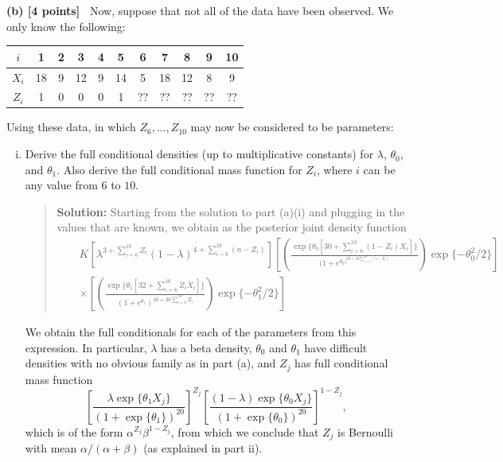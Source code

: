 \documentclass{article}
\newcommand{\svskip}{\vspace{.2in}}
\begin{document}
\svskip
{\bf (b) [4 points]\ }
Now, suppose that not all of the data have been observed.  We
only know the following:

\svskip
\begin{tabular}{c|cccccccccc}
$i$ & 1 & 2 & 3 & 4 & 5 & 6 & 7 & 8 & 9 & 10 \\ \hline
$X_i$ & 18 & 9 & 12 & 9 & 14 & 5 & 18 & 12 & 8 & 9 \\ \hline
$Z_i$ & 1 & 0 & 0 & 0 & 1 & ?? & ?? & ?? & ?? & ?? 
\end{tabular}

\svskip
Using these data, in which $Z_6, \ldots, Z_{10}$ may now be considered
to be parameters:

\begin{enumerate}[(i)]
\item 
Derive the full conditional densities 
(up to multiplicative constants) for $\lambda$, 
$\theta_0$, and $\theta_1$.  Also derive the full conditional 
mass function for $Z_i$, where $i$ can be any value from $6$ 
to $10$.
\begin{quotation}{\bf Solution:}
Starting from the solution to part (a)(i) and plugging in the values that are known, we obtain
as the posterior joint density function
\begin{eqnarray*}
&&
K
\left[ \lambda^{3+\sum_{i=6}^{10} Z_i} (1-\lambda)^{4+\sum_{i=6}^{10}(n-Z_i)}  \right]
\left[ \left( \frac{\exp\{ \theta_0 [30+\sum_{i=6}^{10} (1-Z_i)X_i] \} }
{(1 + e^{\theta_0)^{60+20\sum_{i=6}^{10} (1-Z_i)}}} \right) \exp\{ -\theta_0^2/2\} \right] \\
&&\times 
\left[ \left( \frac{\exp\{  \theta_1 [32 +\sum_{i=6}^{10} Z_i X_i] \}}{(1 + e^{\theta_1})^{40+20\sum_{i=6}^{10} Z_i}} \right) \exp\{ -\theta_1^2/2\} \right]
\end{eqnarray*}
\end{quotation}
We obtain the full conditionals for each of the parameters from this expression.  In particular,
$\lambda$ has a beta density, $\theta_0$ and $\theta_1$ have difficult densities with no obvious
family as in part (a), and $Z_j$ has full conditional mass function
\[
\left[ \frac{ \lambda \exp\{\theta_1 X_j\}}{ (1+\exp\{\theta_1\})^{20}} \right]^{Z_j}
\left[ \frac{ (1-\lambda) \exp\{\theta_0 X_j\}}{ (1+\exp\{\theta_0\})^{20}} \right]^{1-Z_j},
\]
which is of the form $\alpha^{Z_j}\beta^{1-Z_j}$, from which we conclude that 
$Z_j$ is Bernoulli with mean $\alpha/(\alpha+\beta)$ (as explained in part ii).


\end{enumerate}
\end{document}
